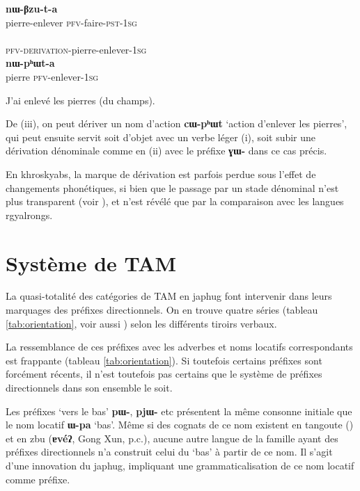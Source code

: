 \documentclass[oldfontcommands,oneside,a4paper,11pt]{article}
\newcommand{\ipa}[1]{{\phon\textbf{\mbox{#1}}}} %
\begin{document}
   \begin{exe}
\ex \label{ex:incorporation}
\begin{xlist}[(ii)]
\gll     \ipa{cɯ-pʰɯt} \ipa{nɯ-βzu-t-a}  \\
 pierre-enlever \textsc{pfv}-faire-\textsc{pst-1sg} \\
\gll     \ipa{nɯ-ɣɯ-cɯ-pʰɯt-a}  \\
  \textsc{pfv}-\textsc{derivation}-pierre-enlever-\textsc{1sg} \\
\gll     \ipa{cɯ} \ipa{nɯ-pʰɯt-a}  \\
  pierre \textsc{pfv}-enlever-\textsc{1sg} \\
  \end{xlist}
 \glt  J'ai enlevé les pierres (du champs).
 
\end{exe}   


De (iii), on peut dériver un nom d'action \ipa{cɯ-pʰɯt} `action d'enlever les pierres', qui peut ensuite servit soit d'objet avec un verbe léger (i), soit subir une dérivation dénominale comme en (ii) avec le préfixe \ipa{ɣɯ-} dans ce cas précis.


En khroskyabs, la marque de dérivation est parfois perdue sous l'effet de changements phonétiques, si bien que le passage par un stade dénominal n'est plus transparent (voir \citealt[185-9]{lai13affixale}), et n'est révélé que par la comparaison avec les langues rgyalrongs.

\section{Système de TAM}
La quasi-totalité des catégories de TAM en japhug font intervenir dans leurs marquages des préfixes directionnels. On en trouve quatre séries (tableau \ref{tab:orientation}, voir aussi \citealt[266]{jacques14linking}) selon les différents tiroirs verbaux. 

La ressemblance de ces préfixes avec les adverbes et noms locatifs correspondants est frappante (tableau \ref{tab:orientation}). Si toutefois certains préfixes sont forcément récents, il n'est toutefois pas certains que le système de préfixes directionnels dans son ensemble le soit.

Les préfixes `vers le bas' \ipa{pɯ-}, \ipa{pjɯ-} etc présentent la même consonne initiale que le nom locatif \ipa{ɯ-pa} `bas'. Même si des cognats de ce nom existent en tangoute (\citealt{jacques14tangoute}) et en zbu (\ipa{ɐvéʔ}, Gong Xun, p.c.), aucune autre langue de la famille ayant des préfixes directionnels n'a construit celui du `bas' à partir de ce nom. Il s'agit d'une innovation du japhug, impliquant une grammaticalisation de ce nom locatif comme préfixe.
\end{document}
